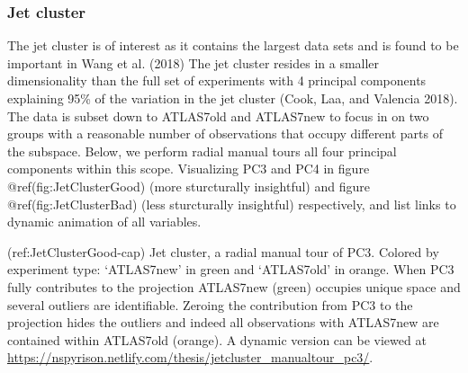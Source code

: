 \hypertarget{jet-cluster}{%
\subsubsection{Jet cluster}\label{jet-cluster}}

The jet cluster is of interest as it contains the largest data sets and is found to be important in Wang et al. (2018) The jet cluster resides in a smaller dimensionality than the full set of experiments with 4 principal components explaining 95\% of the variation in the jet cluster (Cook, Laa, and Valencia 2018). The data is subset down to ATLAS7old and ATLAS7new to focus in on two groups with a reasonable number of observations that occupy different parts of the subspace. Below, we perform radial manual tours all four principal components within this scope. Visualizing PC3 and PC4 in figure @ref(fig:JetClusterGood) (more sturcturally insightful) and figure @ref(fig:JetClusterBad) (less sturcturally insightful) respectively, and list links to dynamic animation of all variables.

(ref:JetClusterGood-cap) Jet cluster, a radial manual tour of PC3. Colored by experiment type: `ATLAS7new' in green and `ATLAS7old' in orange. When PC3 fully contributes to the projection ATLAS7new (green) occupies unique space and several outliers are identifiable. Zeroing the contribution from PC3 to the projection hides the outliers and indeed all observations with ATLAS7new are contained within ATLAS7old (orange). A dynamic version can be viewed at \url{https://nspyrison.netlify.com/thesis/jetcluster_manualtour_pc3/}.

